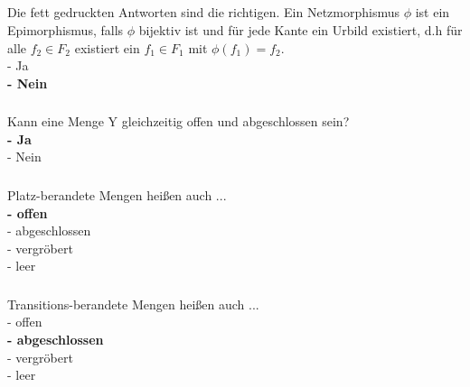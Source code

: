 \documentclass[a4paper,12pt]{scrartcl}
\begin{document}
\subsubsection{}

\subsubsection{}
\subsection{}
\subsubsection{}
Die fett gedruckten Antworten sind die richtigen.
Ein Netzmorphismus $\phi$ ist ein Epimorphismus, falls $\phi$ bijektiv ist und für jede Kante ein Urbild existiert, d.h für alle $f_2\in F_2$ existiert ein $f_1\in F_1$ mit $\phi(f_1)=f_2$.\\
- Ja\\
\textbf{- Nein}
\subsubsection{}
Kann eine Menge Y gleichzeitig offen und abgeschlossen sein?\\
\textbf{- Ja}\\
- Nein
\subsubsection{}
Platz-berandete Mengen heißen auch ...\\
\textbf{- offen}\\
- abgeschlossen\\
- vergröbert\\
- leer
\subsubsection{}
Transitions-berandete Mengen heißen auch ...\\
- offen\\
\textbf{- abgeschlossen}\\
- vergröbert\\
- leer
\end{document}
